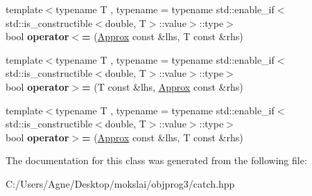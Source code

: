 \begin{DoxyCompactItemize}
\item 
\mbox{\label{class_catch_1_1_detail_1_1_approx_a6040b908588745570847d7ae8483b091}} 
{\footnotesize template$<$typename T , typename  = typename std\+::enable\+\_\+if$<$std\+::is\+\_\+constructible$<$double, T$>$\+::value$>$\+::type$>$ }\\bool {\bfseries operator$<$=} (\mbox{\hyperlink{class_catch_1_1_detail_1_1_approx}{Approx}} const \&lhs, T const \&rhs)
\item 
\mbox{\label{class_catch_1_1_detail_1_1_approx_affd27efc62be386daeecb7a09e828d44}} 
{\footnotesize template$<$typename T , typename  = typename std\+::enable\+\_\+if$<$std\+::is\+\_\+constructible$<$double, T$>$\+::value$>$\+::type$>$ }\\bool {\bfseries operator$>$=} (T const \&lhs, \mbox{\hyperlink{class_catch_1_1_detail_1_1_approx}{Approx}} const \&rhs)
\item 
\mbox{\label{class_catch_1_1_detail_1_1_approx_a5899b8a36725406701e2ebded2971ee6}} 
{\footnotesize template$<$typename T , typename  = typename std\+::enable\+\_\+if$<$std\+::is\+\_\+constructible$<$double, T$>$\+::value$>$\+::type$>$ }\\bool {\bfseries operator$>$=} (\mbox{\hyperlink{class_catch_1_1_detail_1_1_approx}{Approx}} const \&lhs, T const \&rhs)
\end{DoxyCompactItemize}


The documentation for this class was generated from the following file\+:\begin{DoxyCompactItemize}
\item 
C\+:/\+Users/\+Agne/\+Desktop/mokslai/objprog3/catch.\+hpp\end{DoxyCompactItemize}
